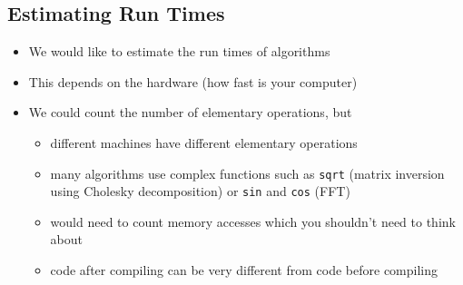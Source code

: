 \begin{slide}
\section{Estimating Run Times}

\vspace{-1cm}
\begin{PauseHighLight}
  \begin{itemize}
  \item We would like to estimate the run times of algorithms\pause
  \item This depends on the hardware (how fast is your computer)\pause
  \item We could count the number of elementary operations\pause, but
    \begin{itemize}
    \item different machines have different elementary operations\pause
    \item many algorithms use complex functions such as \texttt{sqrt}
      (matrix inversion using Cholesky decomposition) or \texttt{sin} and
      \texttt{cos} (FFT)\pause
    \item would need to count memory accesses which you shouldn't need
      to think about\pause
    \item code after compiling can be very different from code before
      compiling \pause
    \end{itemize}
  \end{itemize}
\end{PauseHighLight}

\end{slide}


